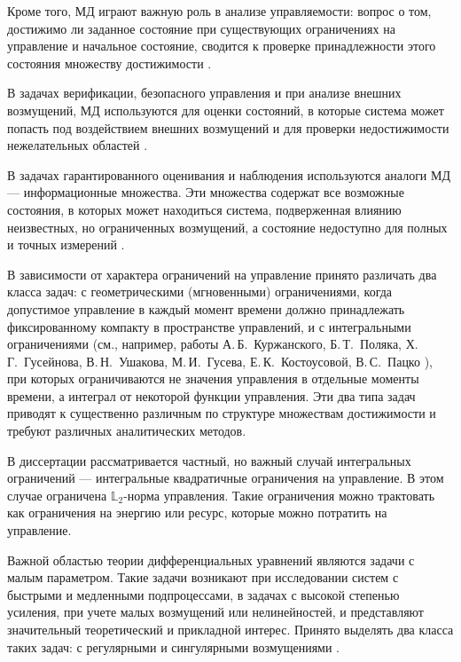 \documentclass[../main.tex]{subfiles}
\begin{document}
Кроме того, МД играют важную роль в анализе управляемости: вопрос о том, достижимо ли заданное состояние при существующих ограничениях на управление и начальное состояние, сводится к проверке принадлежности этого состояния множеству достижимости \cite{Kur1, Kurzhanski1977}.

В задачах верификации, безопасного управления и при анализе внешних возмущений, МД используются для оценки состояний, в которые система может попасть под воздействием внешних возмущений и для проверки недостижимости нежелательных областей \cite{Mitchell, Filippova2015}. 

В задачах гарантированного оценивания и наблюдения используются аналоги МД --- информационные множества. 
Эти множества содержат все возможные состояния, в которых может находиться система, подверженная влиянию неизвестных, но ограниченных возмущений, а состояние недоступно для полных и точных измерений \cite{Kurzhanski1977, Kur1, Schweppe, bi2000, Patsko2019}.

В зависимости от характера ограничений на управление принято различать два класса задач: с геометрическими (мгновенными) ограничениями, когда допустимое управление в каждый момент времени должно принадлежать фиксированному компакту в пространстве управлений, и с интегральными ограничениями (см., например, работы А.\,Б.~Куржанского, Б.\,Т.~Поляка, Х.\,Г.~Гусейнова, В.\,Н.~Ушакова, М.\,И.~Гусева, Е.\,К.~Костоусовой, В.\,С.~Пацко \cite{Kur1, Polyak2004, Guseinov2007, Guseinov2009, Guseinov2010, Guseinov2024, GusZyk, Kostousova,Patsko2023}), при которых ограничиваются не значения управления в отдельные моменты времени, а интеграл от некоторой функции управления. 
Эти два типа задач приводят к существенно различным по структуре множествам достижимости и требуют различных аналитических методов.

В диссертации рассматривается частный, но важный случай интегральных ограничений --- интегральные квадратичные ограничения на управление. 
В этом случае ограничена $\mathbb{L}_2$-норма управления. 
Такие ограничения можно трактовать как ограничения на энергию или ресурс, которые можно потратить на управление. 

Важной областью теории дифференциальных уравнений являются задачи с малым параметром.
Такие задачи возникают при исследовании систем с быстрыми и медленными подпроцессами, в задачах с высокой степенью усиления, при учете малых возмущений или нелинейностей, и представляют значительный теоретический и прикладной интерес. 
Принято выделять два класса таких задач: с регулярными и сингулярными возмущениями \cite{Tihonov1948,Tihonov1952}.
\end{document}
